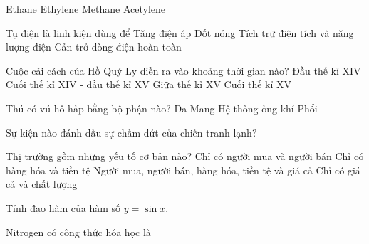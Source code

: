 \begin{ex}
    \choice
    {Ethane}
    {Ethylene}
    {\True Methane}
    {Acetylene}

\end{ex}
\begin{ex}
    Tụ điện là linh kiện dùng để
    \choice
    {Tăng điện áp}
    {Đốt nóng}
    {\True Tích trữ điện tích và năng lượng điện}
    {Cản trở dòng điện hoàn toàn}

\end{ex}
\begin{ex}
    Cuộc cải cách của Hồ Quý Ly diễn ra vào khoảng thời gian nào?
    \choice
    {Đầu thế kỉ XIV}
    {\True Cuối thế kỉ XIV - đầu thế kỉ XV}
    {Giữa thế kỉ XV}
    {Cuối thế kỉ XV}

\end{ex}
\begin{ex}
    Thú có vú hô hấp bằng bộ phận nào?
    \choice
    {Da}
    {Mang}
    {Hệ thống ống khí}
    {\True Phổi}

\end{ex}
\begin{ex}
    Sự kiện nào đánh dấu sự chấm dứt của chiến tranh lạnh?
\end{ex}
\begin{ex}
    Thị trường gồm những yếu tố cơ bản nào?
    \choice
    {Chỉ có người mua và người bán}
    {Chỉ có hàng hóa và tiền tệ}
    {\True Người mua, người bán, hàng hóa, tiền tệ và giá cả}
    {Chỉ có giá cả và chất lượng}

\end{ex}
\begin{ex}
    Tính đạo hàm của hàm số $y = \sin x$.
\end{ex}
\begin{ex}
    Nitrogen có công thức hóa học là
\end{ex}
